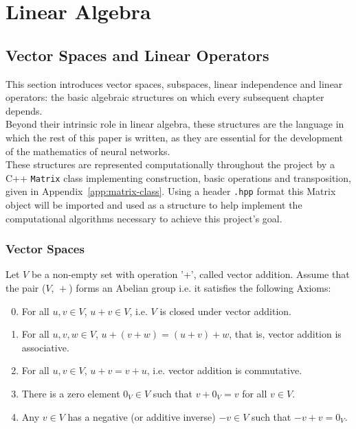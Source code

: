 \chapter{Linear Algebra}
\label{chap:linear-algebra}
\section{Vector Spaces and Linear Operators}
\label{sec:vector-spaces-and-linear-operators}
	
	This section introduces vector spaces, subspaces, linear independence and linear operators: the basic algebraic structures on which every subsequent chapter depends. \\
	
	Beyond their intrinsic role in linear algebra, these structures are the language in which the rest of this paper is written, as they are essential for the development of the mathematics of neural networks. \\
	
	These structures are represented computationally throughout the project by a C++ \texttt{Matrix} class implementing construction, basic operations and transposition, given in Appendix~\ref{app:matrix-class}. Using a header \texttt{.hpp} format this Matrix object will be imported and used as a structure to help implement the computational algorithms necessary to achieve this project's goal.
	
	\subsection{Vector Spaces}
		
		\indent \indent Let $V$ be a non-empty set with operation '+', called vector addition. Assume that the pair ($V,\, +$) forms an Abelian group i.e. it satisfies the following Axioms:
		
		\begin{enumerate}[label=($A_\arabic*$), leftmargin=3em]
			\setcounter{enumi}{-1}
			\item \label{ax:A0} For all $u, v \in V$, $u + v \in V$, i.e. $V$ is closed under vector addition.
			\item \label{ax:A1} For all $u, v, w \in V$, $u + (v + w) = (u + v) + w$, that is, vector addition is associative.
			\item \label{ax:A2} For all $u, v \in V$, $u + v = v + u$, i.e. vector addition is commutative.
			\item \label{ax:A3} There is a zero element $0_V \in V$ such that $v + 0_V = v$ for all $v \in V$.
			\item \label{ax:A4} Any $v \in V$ has a negative (or additive inverse) $-v \in V$ such that $-v + v = 0_V$.
		\end{enumerate}
		
